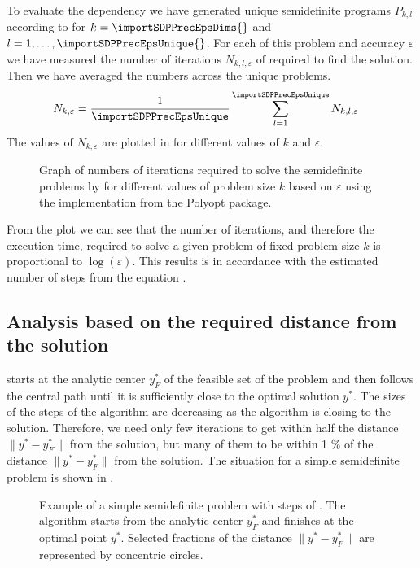 To evaluate the dependency we have generated unique semidefinite programs $P_{k, l}$ according to  for $k = \importSDPPrecEpsDims{}$ and $l = 1,\ldots,\importSDPPrecEpsUnique{}$.
For each of this problem and accuracy $\varepsilon$ we have measured the number of iterations $N_{k,l,\varepsilon}$ of  required to find the solution.
Then we have averaged the numbers across the unique problems.
\begin{align}
  N_{k,\varepsilon} &= \frac{1}{\importSDPPrecEpsUnique}\sum_{l=1}^{\importSDPPrecEpsUnique}N_{k,l,\varepsilon}
\end{align}
The values of $N_{k,\varepsilon}$ are plotted in  for different values of $k$ and $\varepsilon$.

\begin{figure}[ht]
  \centering
  \resizebox{0.95\textwidth}{!}{}
  \caption{Graph of numbers of iterations required to solve the semidefinite problems by  for different values of problem size $k$ based on $\varepsilon$ using the implementation from the Polyopt package.}
\end{figure}

From the plot we can see that the number of iterations, and therefore the execution time, required to solve a given problem of fixed problem size $k$ is proportional to $\log(\varepsilon)$.
This results is in accordance with the estimated number of steps from the equation .

\subsection{Analysis based on the required distance from the solution}

 starts at the analytic center $y_F^*$ of the feasible set of the problem and then follows the central path until it is sufficiently close to the optimal solution $y^*$.
The sizes of the steps of the algorithm are decreasing as the algorithm is closing to the solution.
Therefore, we need only few iterations to get within half the distance $\|y^* - y_F^*\|$ from the solution, but many of them to be within 1 \% of the distance $\|y^* - y_F^*\|$ from the solution.
The situation for a simple semidefinite problem is shown in .

\begin{figure}[ht]
  \centering
  \resizebox{0.95\textwidth}{!}{}
  \caption{Example of a simple semidefinite problem with steps of . The algorithm starts from the analytic center $y^*_{F}$ and finishes at the optimal point $y^*$. Selected fractions of the distance $\|y^* - y_F^*\|$ are represented by concentric circles.}
\end{figure}

